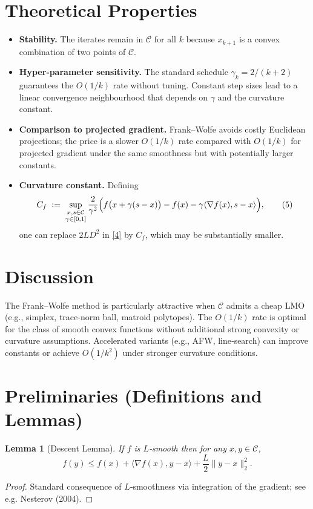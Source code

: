 \documentclass{article}
\newtheorem{lemma}{Lemma}
\begin{document}
\section*{Theoretical Properties}
\begin{itemize}
\item \textbf{Stability.} The iterates remain in $\mathcal{C}$ for all $k$ because $x_{k+1}$ is a convex combination of two points of $\mathcal{C}$.
\item \textbf{Hyper‑parameter sensitivity.} The standard schedule $\gamma_k=2/(k+2)$ guarantees the $O(1/k)$ rate without tuning. Constant step sizes lead to a linear convergence neighbourhood that depends on $\gamma$ and the curvature constant.
\item \textbf{Comparison to projected gradient.} Frank–Wolfe avoids costly Euclidean projections; the price is a slower $O(1/k)$ rate compared with $O(1/k)$ for projected gradient under the same smoothness but with potentially larger constants.
\item \textbf{Curvature constant.} Defining
\[
C_f \;:=\; \sup_{\substack{x,s\in\mathcal{C}\\ \gamma\in[0,1]}} \frac{2}{\gamma^{2}}
\Bigl(f\bigl(x+\gamma(s-x)\bigr)-f(x)-\gamma\langle\nabla f(x),s-x\rangle\Bigr),
\tag{5}
\]
one can replace $2LD^{2}$ in \eqref{4} by $C_f$, which may be substantially smaller.
\end{itemize}

\section*{Discussion}
The Frank–Wolfe method is particularly attractive when $\mathcal{C}$ admits a cheap LMO (e.g., simplex, trace‑norm ball, matroid polytopes). The $O(1/k)$ rate is optimal for the class of smooth convex functions without additional strong convexity or curvature assumptions. Accelerated variants (e.g., AFW, line‑search) can improve constants or achieve $O(1/k^{2})$ under stronger curvature conditions.

\newpage
\section*{Preliminaries (Definitions and Lemmas)}

\begin{lemma}[Descent Lemma]\label{lem:descent}
If $f$ is $L$‑smooth then for any $x,y\in\mathcal{C}$,
\[
f(y) \le f(x) + \langle\nabla f(x),y-x\rangle + \frac{L}{2}\|y-x\|_2^{2}.
\tag{6}
\]
\end{lemma}
\begin{proof}
Standard consequence of $L$‑smoothness via integration of the gradient; see e.g. Nesterov (2004). \qedhere
\end{proof}
\end{document}

